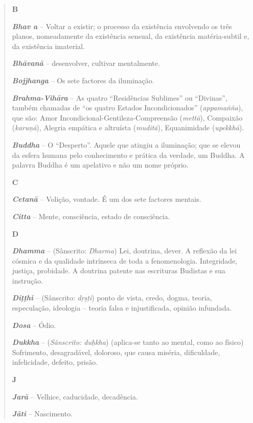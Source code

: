 \begin{quote}
\textbf{B}

\emph{\textbf{Bhav a}} -- Voltar a existir; o processo da existência envolvendo os três planos, nomeadamente da existência sensual, da existência matéria-subtil e, da existência imaterial.

\emph{\textbf{Bhāvanā}} -- desenvolver, cultivar mentalmente.

\emph{\textbf{Bojjhanga}} -- Os sete factores da iluminação.

\emph{\textbf{Brahma-Vihāra}} -- As quatro ``Residências Sublimes'' ou ``Divinas'', também chamadas de ``os quatro Estados Incondicionados'' (\emph{appamañña}), que são: Amor Incondicional-Gentileza-Compreensão (\emph{mettā}), Compaixão (\emph{karuṇā}), Alegria empática e altruísta (\emph{muditā}), Equanimidade (\emph{upekkhā}).

\emph{\textbf{Buddha}} -- O ``Desperto''. Aquele que atingiu a iluminação; que se elevou da esfera humana pelo conhecimento e prática da verdade, um Buddha. A palavra Buddha é um apelativo e não um nome próprio.

\textbf{C}

\emph{\textbf{Cetanā}} -- Volição, vontade. É um dos sete factores mentais.

\emph{\textbf{Citta}} -- Mente, consciência, estado de consciência.

\textbf{D}

\emph{\textbf{Dhamma}} -- (Sânscrito: \emph{Dharma}) Lei, doutrina, dever. A reflexão da lei cósmica e da qualidade intrínseca de toda a fenomenologia. Integridade, justiça, probidade. A doutrina patente nas escrituras Budistas e sua instrução.

\emph{\textbf{Diṭṭhi}} -- (Sânscrito: \emph{dṛṣṭi}) ponto de vista, credo, dogma, teoria, especulação, ideologia -- teoria falsa e injustificada, opinião infundada.

\emph{\textbf{Dosa}} -- Ódio.

\emph{\textbf{Dukkha}} -- (\emph{Sânscrito: duḥkha}) (aplica-se tanto ao mental, como ao físico) Sofrimento, desagradável, doloroso, que causa miséria, dificuldade, infelicidade, defeito, prisão.

\textbf{J}

\emph{\textbf{Jarā}} -- Velhice, caducidade, decadência.

\emph{\textbf{Jāti}} -- Nascimento.


\end{quote}
